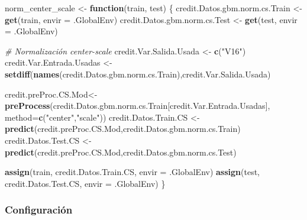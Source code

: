 \documentclass[
]{article}
\newenvironment{Shaded}{\begin{snugshade}}{\end{snugshade}}
\newcommand{\AttributeTok}[1]{\textcolor[rgb]{0.13,0.29,0.53}{#1}}
\newcommand{\CommentTok}[1]{\textcolor[rgb]{0.56,0.35,0.01}{\textit{#1}}}
\newcommand{\ControlFlowTok}[1]{\textcolor[rgb]{0.13,0.29,0.53}{\textbf{#1}}}
\newcommand{\FunctionTok}[1]{\textcolor[rgb]{0.13,0.29,0.53}{\textbf{#1}}}
\newcommand{\NormalTok}[1]{#1}
\newcommand{\OtherTok}[1]{\textcolor[rgb]{0.56,0.35,0.01}{#1}}
\newcommand{\StringTok}[1]{\textcolor[rgb]{0.31,0.60,0.02}{#1}}
\begin{document}
\begin{Shaded}
\begin{Highlighting}[]
\NormalTok{norm\_center\_scale }\OtherTok{\textless{}{-}} \ControlFlowTok{function}\NormalTok{(train, test) \{}
\NormalTok{  credit.Datos.gbm.norm.cs.Train }\OtherTok{\textless{}{-}} \FunctionTok{get}\NormalTok{(train, }\AttributeTok{envir =}\NormalTok{ .GlobalEnv)}
\NormalTok{  credit.Datos.gbm.norm.cs.Test }\OtherTok{\textless{}{-}} \FunctionTok{get}\NormalTok{(test, }\AttributeTok{envir =}\NormalTok{ .GlobalEnv)}
  
  \CommentTok{\# Normalización center{-}scale}
\NormalTok{  credit.Var.Salida.Usada }\OtherTok{\textless{}{-}} \FunctionTok{c}\NormalTok{(}\StringTok{"V16"}\NormalTok{)}
\NormalTok{  credit.Var.Entrada.Usadas }\OtherTok{\textless{}{-}} \FunctionTok{setdiff}\NormalTok{(}\FunctionTok{names}\NormalTok{(credit.Datos.gbm.norm.cs.Train),credit.Var.Salida.Usada)}
  
\NormalTok{  credit.preProc.CS.Mod}\OtherTok{\textless{}{-}}\FunctionTok{preProcess}\NormalTok{(credit.Datos.gbm.norm.cs.Train[credit.Var.Entrada.Usadas],}
                                    \AttributeTok{method=}\FunctionTok{c}\NormalTok{(}\StringTok{"center"}\NormalTok{,}\StringTok{"scale"}\NormalTok{))}
\NormalTok{  credit.Datos.Train.CS }\OtherTok{\textless{}{-}} \FunctionTok{predict}\NormalTok{(credit.preProc.CS.Mod,credit.Datos.gbm.norm.cs.Train)}
\NormalTok{  credit.Datos.Test.CS }\OtherTok{\textless{}{-}} \FunctionTok{predict}\NormalTok{(credit.preProc.CS.Mod,credit.Datos.gbm.norm.cs.Test)}
  
  \FunctionTok{assign}\NormalTok{(train, credit.Datos.Train.CS, }\AttributeTok{envir =}\NormalTok{ .GlobalEnv)}
  \FunctionTok{assign}\NormalTok{(test, credit.Datos.Test.CS, }\AttributeTok{envir =}\NormalTok{ .GlobalEnv)}
\NormalTok{\}}
\end{Highlighting}
\end{Shaded}

\hypertarget{configuraciuxf3n}{%
\subsubsection{Configuración}\label{configuraciuxf3n}}
\end{document}
